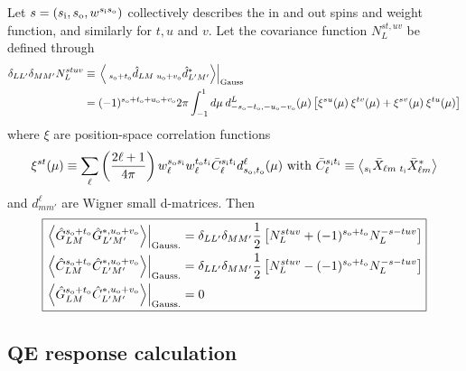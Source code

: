 \documentclass{article}
\newcommand{\si}[0]{{s_{\rm i}}}
\newcommand{\ti}[0]{{t_{\rm i}}}
\newcommand{\so}[0]{{s_{\rm o}}}
\renewcommand{\to}[0]{{t_{\rm o}}}
\newcommand{\uo}[0]{{u_{\rm o}}}
\newcommand{\vo}[0]{{v_{\rm o}}}
\newcommand{\av}[1]{\left\langle #1 \right\rangle}
\begin{document}
Let $s = (\si, \so, w^{\si\so})$ collectively describes the in and out spins and weight function, and similarly for $t, u$ and $v$. Let the covariance function $N^{st, uv}_L$ be defined through
\begin{equation}
\begin{split}
 \delta_{LL'}\delta_{MM'}N_L^{stuv} &\equiv \left.\av{\:_{\so + \to}\hat d_{LM}\: _{\uo + \vo}\hat d^*_{L'M'}} \right|_{\rm Gauss}\\ &= (-1)^{\so + \to + \uo + \vo}2\pi  \int_{-1}^1 d \mu\:  d^L_{-\so - \to, -\uo - \vo}(\mu) \left[\xi^{su}(\mu)\:\xi^{tv}(\mu)  + \xi^{sv}(\mu)\:\xi^{tu}(\mu) \right]
\end{split}
\end{equation}
where $\xi$ are position-space correlation functions
\begin{equation}
\xi^{st}(\mu) \equiv  \sum_\ell \left(\frac{2\ell + 1}{4\pi}\right)w^{\so\si}_\ell w^{\to\ti}_\ell \bar C_\ell^{\si \ti} d^\ell_{\so,\to}(\mu)\textrm{ with } \bar C_\ell^{\si \ti} \equiv \av{ _{\si}\bar X_{\ell m}\: _{\ti} \bar X^*_{\ell m} }
\end{equation}
and $d^\ell_{mm'}$ are Wigner small d-matrices.
Then
\begin{equation} \boxed{
\begin{split}
\left.\av{\hat G^{\so + \to}_{LM} \hat G^{*, \uo + \vo}_{L' M'} }\right|_{\rm Gauss.} &=\delta_{LL'}\delta_{MM'} \frac 12\left[N_L^{stuv} +  (-1)^{\so + \to} N^{-s-tuv}_L\right] \\
		\left.\av{\hat C^{\so + \to}_{LM} \hat C^{*, \uo + \vo}_{L' M'} }\right|_{\rm Gauss.} &= \delta_{LL'}\delta_{MM'}\frac 12\left[N_L^{stuv} -  (-1)^{\so + \to} N^{-s-tuv}_L\right]\\
	\left.\av{\hat G^{\so + \to}_{LM} \hat C^{*, \uo + \vo}_{L' M'} }\right|_{\rm Gauss.} &=0
\end{split}}
\end{equation}
\subsection{QE response calculation}
\end{document}
